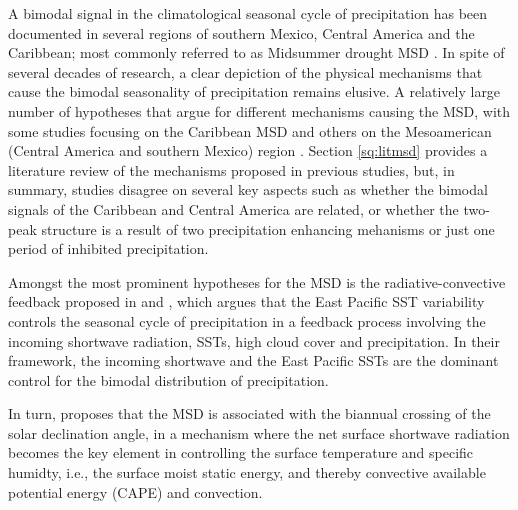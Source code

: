 A bimodal signal in the climatological seasonal cycle of precipitation has been documented in several regions of southern Mexico, Central America and the Caribbean; most commonly referred to as Midsummer drought MSD \citep{mosino1966,magana1999,gamble2008,perdigon2018,zhao2020}.  
In spite of several decades of research, a clear depiction of the physical mechanisms that cause the bimodal seasonality of precipitation remains elusive.
A relatively large number of hypotheses that argue for different mechanisms causing the MSD, with some studies focusing on the Caribbean MSD \citep[][]{martinez2019} and others on the Mesoamerican (Central America and southern Mexico) region \citep[e.g][]{perdigon2018}.
Section \ref{sq:litmsd} provides a literature review of the mechanisms proposed in previous studies, but, in summary, studies disagree on several key aspects such as whether the bimodal signals of the Caribbean and Central America are related, or whether the two-peak structure is a result of two precipitation enhancing mehanisms or just one period of inhibited precipitation. 



Amongst the most prominent hypotheses for the MSD is the radiative-convective feedback proposed in \cite{magana1999} and \cite{magana2005}, which argues that the East Pacific SST variability controls the seasonal cycle of precipitation in a feedback process involving the incoming shortwave radiation, SSTs, high cloud cover and precipitation. In their framework, the incoming shortwave and the East Pacific SSTs are the dominant control for the bimodal distribution of precipitation. %

In turn, \cite{karnauskas2013} proposes that the MSD is associated with the biannual crossing of the solar declination angle, in a mechanism where the net surface shortwave radiation becomes the key element in controlling the surface temperature and specific humidty, i.e., the surface moist static energy, and thereby convective available potential energy (CAPE) and convection. 

